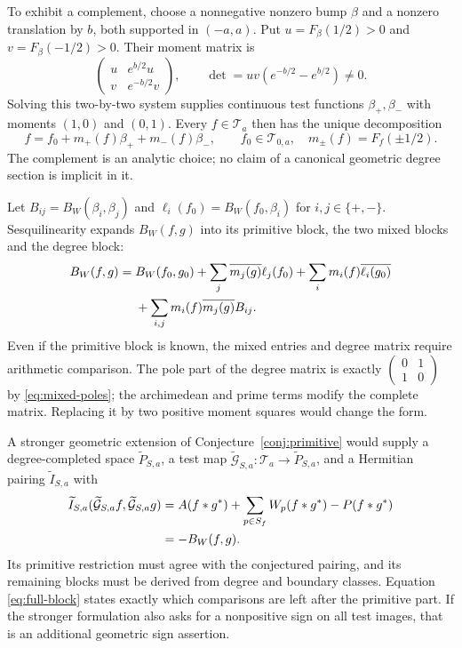 \documentclass[11pt,letterpaper]{article}
\theoremstyle{definition}
\theoremstyle{remark}
\newcommand{\T}{\mathcal T}
\begin{document}
To exhibit a complement, choose a nonnegative nonzero bump
$\beta$ and a nonzero translation by $b$, both supported in
$(-a,a)$. Put $u=F_\beta(1/2)>0$ and $v=F_\beta(-1/2)>0$.
Their moment matrix is
\begin{equation}
 \begin{pmatrix}u&e^{b/2}u\\v&e^{-b/2}v\end{pmatrix},\qquad
 \det=uv(e^{-b/2}-e^{b/2})\ne0.
 \label{eq:moment-matrix}
\end{equation}
Solving this two-by-two system supplies continuous test functions
$\beta_+,\beta_-$ with moments $(1,0)$ and $(0,1)$.
Every $f\in\T_a$ then has the unique decomposition
\begin{equation}
 f=f_0+m_+(f)\beta_++m_-(f)\beta_-,\qquad
 f_0\in\T_{0,a},\quad m_\pm(f)=F_f(\pm1/2).
 \label{eq:moment-splitting}
\end{equation}
The complement is an analytic choice; no claim of a canonical
geometric degree section is implicit in it.

Let $B_{ij}=B_W(\beta_i,\beta_j)$ and
$\ell_i(f_0)=B_W(f_0,\beta_i)$ for $i,j\in\{+,-\}$.
Sesquilinearity expands $B_W(f,g)$ into its primitive block,
the two mixed blocks and the degree block:
\begin{align}
 B_W(f,g)={}&B_W(f_0,g_0)
 +\sum_j\overline{m_j(g)}\ell_j(f_0)
 +\sum_i m_i(f)\overline{\ell_i(g_0)}\notag\\
 &+\sum_{i,j}m_i(f)\overline{m_j(g)}B_{ij}.
 \label{eq:full-block}
\end{align}
Even if the primitive block is known, the mixed entries and
degree matrix require arithmetic comparison. The pole part of
the degree matrix is exactly
$\left(\begin{smallmatrix}0&1\\1&0\end{smallmatrix}\right)$ by
\eqref{eq:mixed-poles}; the archimedean and prime terms modify
the complete matrix. Replacing it by two positive moment
squares would change the form.

A stronger geometric extension of Conjecture~\ref{conj:primitive}
would supply a degree-completed space $\widetilde P_{S,a}$,
a test map $\widetilde{\mathcal G}_{S,a}:\T_a\to\widetilde P_{S,a}$,
and a Hermitian pairing $\widetilde I_{S,a}$ with
\begin{align}
 \widetilde I_{S,a}(\widetilde{\mathcal G}_{S,a}f,
                   \widetilde{\mathcal G}_{S,a}g)
 &=A(f*g^*)+\sum_{p\in S_f}W_p(f*g^*)-P(f*g^*)\notag\\
 &=-B_W(f,g).
 \label{eq:alltest-comparison}
\end{align}
Its primitive restriction must agree with the conjectured
pairing, and its remaining blocks must be derived from degree
and boundary classes. Equation \eqref{eq:full-block} states
exactly which comparisons are left after the primitive part.
If the stronger formulation also asks for a nonpositive sign on
all test images, that is an additional geometric sign assertion.
\end{document}
